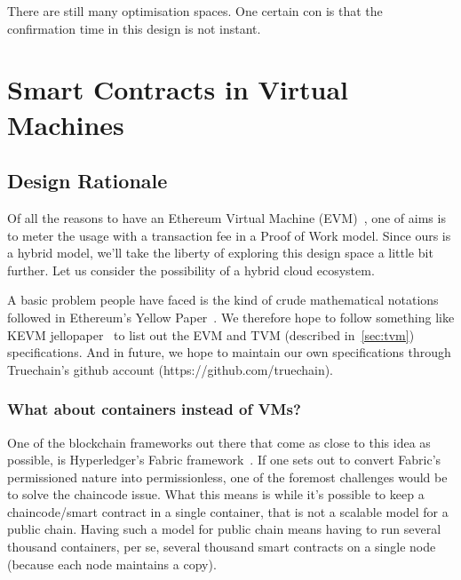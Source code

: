\documentclass[9pt,oneside]{amsart}
\begin{document}
\begin{multicols}{2}
There are still many optimisation spaces. One certain con is that the confirmation time in this design is not instant.



\section{Smart Contracts in Virtual Machines}

\subsection{Design Rationale}

Of all the reasons to have an Ethereum Virtual Machine (EVM)~\cite{gavinethereum}, one of aims is to meter the usage with a transaction fee
in a Proof of Work model. Since ours is a hybrid model, we'll take the liberty of exploring this design space a little bit further. Let us
consider the possibility of a hybrid cloud ecosystem.

A basic problem people have faced is the kind of crude mathematical notations followed in Ethereum's Yellow Paper~\cite{gavinethereum}.
We therefore hope to follow something like KEVM jellopaper~\cite{kevmjello} to list out the EVM and TVM (described in~\ref{sec:tvm}) specifications.
And in future, we hope to maintain our own specifications through Truechain's github account (https://github.com/truechain).

\subsubsection{What about containers instead of VMs?}

One of the blockchain frameworks out there that come as close to this idea as possible, is Hyperledger's Fabric framework~\cite{fabricpaper}.
If one sets out to convert Fabric's permissioned nature into permissionless, one of the foremost challenges
would be to solve the chaincode issue. What this means is while it's possible to keep a chaincode/smart contract in a single container,
that is not a scalable model for a public chain. Having such a model for public chain means having to run several thousand containers,
per se, several thousand smart contracts on a single node (because each node maintains a copy).


\end{multicols}
\end{document}
